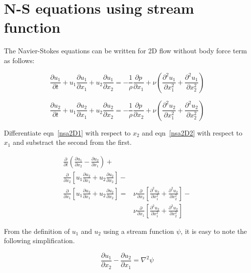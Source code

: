 \section{N-S equations using stream function}

The Navier-Stokes equations can be written for 2D flow without body force term as follows:

\begin{equation}
\label{nsa2D1}
\frac{\partial u_1}{\partial t} + u_1\frac{\partial u_1}{\partial x_1} + u_2\frac{\partial u_1}{\partial x_2} = -  \frac{1}{\rho}\frac{\partial p}{\partial x_1} + \nu \left( \frac{\partial^2 u_1}{\partial x_1^2} + \frac{\partial^2 u_1}{\partial x_2^2} \right)
\end{equation} 

\begin{equation}
\label{nsa2D2}
\frac{\partial u_2}{\partial t} + u_1\frac{\partial u_2}{\partial x_1} + u_2\frac{\partial u_2}{\partial x_2} = -  \frac{1}{\rho}\frac{\partial p}{\partial x_2} + \nu \left( \frac{\partial^2 u_2}{\partial x_1^2} + \frac{\partial^2 u_2}{\partial x_2^2} \right)
\end{equation} 

Differentiate eqn~\ref{nsa2D1} with respect to $x_2$ and eqn~\ref{nsa2D2} with respect to $x_1$ and substract the second from the first.

\begin{eqnarray}
\label{nsa2Ds}
\frac{\partial }{\partial t} \left( \frac{\partial u_1}{\partial x_2} - \frac{\partial u_2}{\partial x_1} \right) + \\ \nonumber
\frac{\partial}{\partial x_2} \left[ u_1\frac{\partial u_2}{\partial x_1} + u_2\frac{\partial u_2}{\partial x_2} \right] -  & \\ \nonumber
\frac{\partial}{\partial x_1} \left[u_1\frac{\partial u_2}{\partial x_1} + u_2\frac{\partial u_2}{\partial x_2} \right] 
  = & \nu \frac{\partial}{\partial x_2} \left[ \frac{\partial^2 u_2}{\partial x_1^2} + \frac{\partial^2 u_2}{\partial x_2^2} \right] - \\ \nonumber
 & \nu \frac{\partial}{\partial x_1} \left[ \frac{\partial^2 u_2}{\partial x_1^2} + \frac{\partial^2 u_2}{\partial x_2^2} \right]
\end{eqnarray}

From the definition of $u_1$ and $u_2$ using a stream function $\psi$, it is easy to note the following simplification.

\begin{equation}
\label{nsa2Ds1}
\frac{\partial u_1}{\partial x_2} - \frac{\partial u_2}{\partial x_1} = \nabla^2 \psi
\end{equation}



